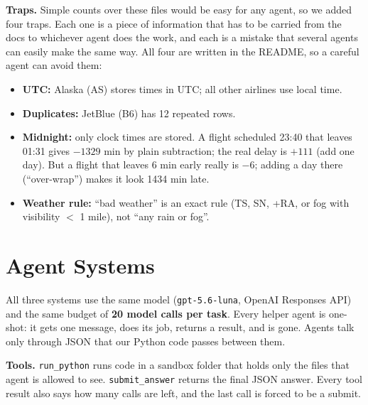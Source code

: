 \documentclass[10pt]{article}
\begin{document}
\textbf{Traps.} Simple counts over these files would be easy for any agent, so we added four traps. Each
one is a piece of information that has to be carried from the docs to whichever agent does the work, and each
is a mistake that several agents can easily make the same way. All four are written in the README, so a careful
agent can avoid them:
\begin{itemize}
\item \textbf{UTC:} Alaska (AS) stores times in UTC; all other airlines use local time.
\item \textbf{Duplicates:} JetBlue (B6) has 12 repeated rows.
\item \textbf{Midnight:} only clock times are stored. A flight scheduled 23:40 that leaves 01:31 gives
  $-1329$ min by plain subtraction; the real delay is $+111$ (add one day). But a flight that leaves 6 min early
  really is $-6$; adding a day there (``over-wrap'') makes it look 1434 min late.
\item \textbf{Weather rule:} ``bad weather'' is an exact rule (TS, SN, +RA, or fog with visibility $<$ 1 mile),
  not ``any rain or fog''.
\end{itemize}

\section{Agent Systems}

All three systems use the same model (\texttt{gpt-5.6-luna}, OpenAI Responses API) and the same budget of
\textbf{20 model calls per task}. Every helper agent is one-shot: it gets one message, does its job, returns
a result, and is gone. Agents talk only through JSON that our Python code passes between them.

\textbf{Tools.} \texttt{run\_python} runs code in a sandbox folder that holds only the files that agent is
allowed to see. \texttt{submit\_answer} returns the final JSON answer. Every tool result also says how many
calls are left, and the last call is forced to be a submit.
\end{document}
